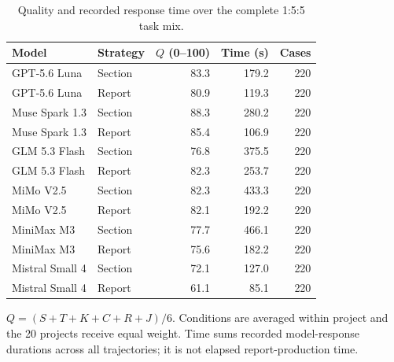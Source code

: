 \begin{table}[t]
\centering\small
\setlength{\tabcolsep}{4pt}
\caption{Quality and recorded response time over the complete 1:5:5 task mix.}
\label{tab:rq2-overall}
\begin{tabular}{llrrr}
\toprule
Model & Strategy & $Q$ (0--100) & Time (s) & Cases \\
\midrule
GPT-5.6 Luna & Section & 83.3 & 179.2 & 220 \\
GPT-5.6 Luna & Report & 80.9 & 119.3 & 220 \\
Muse Spark 1.3 & Section & 88.3 & 280.2 & 220 \\
Muse Spark 1.3 & Report & 85.4 & 106.9 & 220 \\
GLM 5.3 Flash & Section & 76.8 & 375.5 & 220 \\
GLM 5.3 Flash & Report & 82.3 & 253.7 & 220 \\
MiMo V2.5 & Section & 82.3 & 433.3 & 220 \\
MiMo V2.5 & Report & 82.1 & 192.2 & 220 \\
MiniMax M3 & Section & 77.7 & 466.1 & 220 \\
MiniMax M3 & Report & 75.6 & 182.2 & 220 \\
Mistral Small 4 & Section & 72.1 & 127.0 & 220 \\
Mistral Small 4 & Report & 61.1 & 85.1 & 220 \\
\bottomrule
\end{tabular}
\par\vspace{3pt}
\begin{minipage}{0.98\linewidth}\footnotesize
$Q=(S+T+K+C+R+J)/6$. Conditions are averaged within project and the 20 projects receive equal weight. Time sums recorded model-response durations across all trajectories; it is not elapsed report-production time.
\end{minipage}
\end{table}
